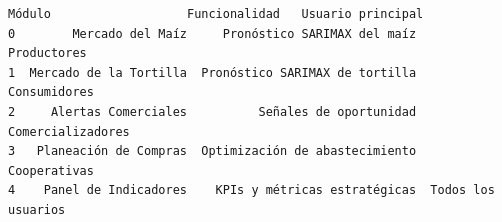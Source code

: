 \documentclass[11pt]{article}
\makeatletter
\newcommand{\boxspacing}{\kern\kvtcb@left@rule\kern\kvtcb@boxsep}
\newcommand{\prompt}[4]{
        {\ttfamily\llap{{\color{#2}[#3]:\hspace{3pt}#4}}\vspace{-\baselineskip}}
    }
\makeatother
\begin{document}
            \begin{tcolorbox}[breakable, size=fbox, boxrule=.5pt, pad at break*=1mm, opacityfill=0]
\prompt{Out}{outcolor}{324}{\boxspacing}
\begin{Verbatim}[commandchars=\\\{\}]
                   Módulo                   Funcionalidad   Usuario principal
0        Mercado del Maíz     Pronóstico SARIMAX del maíz         Productores
1  Mercado de la Tortilla  Pronóstico SARIMAX de tortilla        Consumidores
2     Alertas Comerciales          Señales de oportunidad   Comercializadores
3   Planeación de Compras  Optimización de abastecimiento        Cooperativas
4    Panel de Indicadores    KPIs y métricas estratégicas  Todos los usuarios
\end{Verbatim}
\end{tcolorbox}
        
\end{document}

